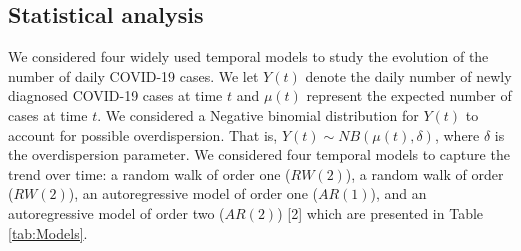 \documentclass[10pt,letterpaper]{article}
\begin{document}
\hypertarget{statistical-analysis}{%
\subsection{Statistical analysis}\label{statistical-analysis}}

We considered four widely used temporal models to study the evolution of the number of daily COVID-19 cases. We let \(Y(t)\) denote the daily
number of newly diagnosed COVID-19 cases at time \(t\) and \(\mu(t)\)
represent the expected number of cases at time \(t\). We considered a
Negative binomial distribution for \(Y(t)\) to account for possible
overdispersion. That is, \(Y(t) \sim NB(\mu(t), \delta)\), where
\(\delta\) is the overdispersion parameter. We considered four temporal
models to capture the trend over time: a random walk of order one (\(RW(2)\)), a random walk of order (\(RW(2)\)), an autoregressive model of order one (\(AR(1)\)), and an autoregressive model of order two (\(AR(2)\))
{[}2{]} which are presented in Table \ref{tab:Models}. 

\end{document}
